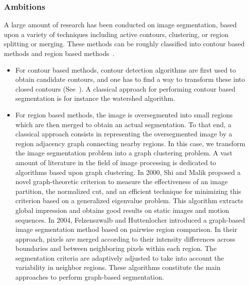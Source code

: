 \documentclass{article}
\begin{document}
        \subsubsection{Ambitions}
            A large amount of research has been conducted on image segmentation, based upon a variety of techniques including active contours, clustering, or region splitting or merging. These methods can be roughly classified into contour based methods and region based methods~\cite{arbelaez_2011}.

            \begin{itemize}
                \item For contour based methods, contour detection algorithms are first used to obtain candidate contours, and one has to find a way to transform these into closed contours (See~\cite{ren_2005, arbelaez_2011}). A classical approach for performing contour based segmentation is for instance the watershed algorithm.

                \item For region based methods, the image is oversegmented into small regions which are then merged to obtain an actual segmentation. To that end, a classical approach consists in representing the oversegmented image by a region adjacency graph connecting nearby regions. In this case, we transform the image segmentation problem into a graph clustering problem. A vast amount of literature in the field of image processing is dedicated to algorithms based upon graph clustering. In 2000, Shi and Malik \cite{shi_2000} proposed a novel graph-theoretic criterion to measure the effectiveness of an image partition, the normalized cut, and an efficient technique for minimizing this criterion based on a generalized eigenvalue problem. This algorithm extracts global impression and obtains good results on static images and motion sequences. In 2004, Felzenszwalb and Huttenlocher \cite{felzenszwalb_2004} introduced a graph-based image segmentation method based on pairwise region comparison. In their approach, pixels are merged according to their intensity differences across boundaries and between neighboring pixels within each region. The segmentation criteria are adaptively adjusted to take into account the variability in neighbor regions. These algorithms constitute the main approaches to perform graph-based segmentation.

            \end{itemize}
\end{document}
